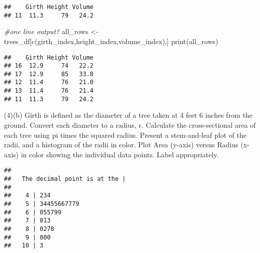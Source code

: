 \documentclass[
]{article}
\newenvironment{Shaded}{\begin{snugshade}}{\end{snugshade}}
\newcommand{\CommentTok}[1]{\textcolor[rgb]{0.56,0.35,0.01}{\textit{#1}}}
\newcommand{\DecValTok}[1]{\textcolor[rgb]{0.00,0.00,0.81}{#1}}
\newcommand{\FunctionTok}[1]{\textcolor[rgb]{0.00,0.00,0.00}{#1}}
\newcommand{\NormalTok}[1]{#1}
\newcommand{\OtherTok}[1]{\textcolor[rgb]{0.56,0.35,0.01}{#1}}
\newcommand{\SpecialCharTok}[1]{\textcolor[rgb]{0.00,0.00,0.00}{#1}}
\begin{document}
\begin{verbatim}
##    Girth Height Volume
## 11  11.3     79   24.2
\end{verbatim}

\begin{Shaded}
\begin{Highlighting}[]
\CommentTok{\#one line output?}
\NormalTok{all\_rows }\OtherTok{\textless{}{-}}\NormalTok{ trees\_df[}\FunctionTok{c}\NormalTok{(girth\_index,height\_index,volume\_index),]}
\FunctionTok{print}\NormalTok{(all\_rows)}
\end{Highlighting}
\end{Shaded}

\begin{verbatim}
##    Girth Height Volume
## 16  12.9     74   22.2
## 17  12.9     85   33.8
## 12  11.4     76   21.0
## 13  11.4     76   21.4
## 11  11.3     79   24.2
\end{verbatim}

(4)(b) Girth is defined as the diameter of a tree taken at 4 feet 6
inches from the ground. Convert each diameter to a radius, r. Calculate
the cross-sectional area of each tree using pi times the squared radius.
Present a stem-and-leaf plot of the radii, and a histogram of the radii
in color. Plot Area (y-axis) versus Radius (x-axis) in color showing the
individual data points. Label appropriately.

\begin{Shaded}
\end{Shaded}

\begin{verbatim}
## 
##   The decimal point is at the |
## 
##    4 | 234
##    5 | 34455667779
##    6 | 055799
##    7 | 013
##    8 | 0278
##    9 | 000
##   10 | 3
\end{verbatim}
\end{document}
